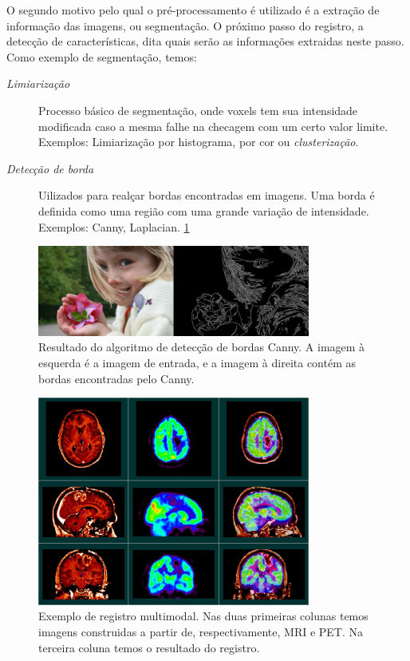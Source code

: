 O segundo motivo pelo qual o pré-processamento é utilizado é a extração de
informação das imagens, ou segmentação. O próximo passo do registro, a detecção
de características, dita quais serão as informações extraidas neste passo. Como
exemplo de segmentação, temos:

\begin{description}
    \item [\textit{Limiarização}] Processo básico de segmentação, onde voxels
          tem sua intensidade modificada caso a mesma falhe na checagem com um
          certo valor limite. Exemplos: Limiarização por histograma, por cor ou
          \textit{clusterização}.
    \item [\textit{Detecção de borda}] Uilizados para realçar bordas encontradas
          em imagens. Uma borda é definida como uma região com uma grande
          variação de intensidade. Exemplos: Canny, Laplacian. \ref{fig:edgeDetection}
\end{description}

\begin{figure}[H]
    \centering
    \includegraphics[width=0.8\textwidth]{figuras/canny.png}
    \caption{Resultado do algoritmo de detecção de bordas Canny. A imagem à
    esquerda é a imagem de entrada, e a imagem à direita contém as bordas
    encontradas pelo Canny.}
    \label{fig:edgeDetection}
\end{figure}

\begin{figure}[H]
  \centering
  \includegraphics[width=0.8\textwidth]{figuras/multiModal.jpg}
  \caption{Exemplo de registro multimodal. Nas duas primeiras colunas temos
  imagens construidas a partir de, respectivamente, MRI e PET. Na terceira
  coluna temos o resultado do registro.}
  \label{fig:multiModal}
\end{figure}

